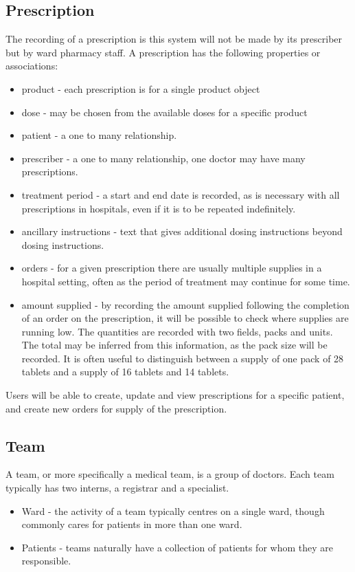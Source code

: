 \documentclass[letterpaper]{amsart}
\begin{document}
\subsection{Prescription}
The recording of a prescription is this system will not be made by its prescriber but by ward pharmacy staff.  A prescription has the following properties or associations:
\begin{itemize}
    \item product - each prescription is for a single product object
    \item dose - may be chosen from the available doses for a specific product
    \item patient - a one to many relationship.
    \item prescriber - a one to many relationship, one doctor may have many prescriptions.
    \item treatment period - a start and end date is recorded, as is necessary with all prescriptions in hospitals, even if it is to be repeated indefinitely.
    \item ancillary instructions - text that gives additional dosing instructions beyond dosing instructions. 
    \item orders - for a given prescription there are usually multiple supplies in a hospital setting, often as the period of treatment may continue for some time.
    \item amount supplied - by recording the amount supplied following the completion of an order on the prescription, it will be possible to check where supplies are running low.  The quantities are recorded with two fields, packs and units.  The total may be inferred from this information, as the pack size will be recorded.  It is often useful to distinguish between a supply of one pack of 28 tablets and a supply of 16 tablets and 14 tablets.
\end{itemize}

Users will be able to create, update and view prescriptions for a specific patient, and create new orders for supply of the prescription.
\subsection{Team}
A team, or more specifically a medical team, is a group of doctors.  Each team typically has two interns, a registrar and a specialist. 
\begin{itemize}
    \item Ward - the activity of a team typically centres on a single ward, though commonly cares for patients in more than one ward. 
    \item Patients - teams naturally have a collection of patients for whom they are responsible.
\end{itemize}
\end{document}
